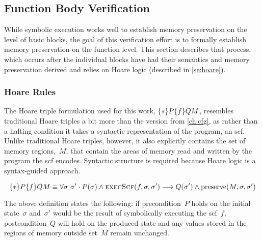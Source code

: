 \subsection{Function Body Verification}
While symbolic execution works well to establish memory preservation on the level of basic blocks,
the goal of this verification effort is to formally establish memory preservation
on the function level. This section describes that process,
which occurs after the individual blocks have had their semantics and memory preservation derived
and relies on Hoare logic (described in \cref{se:hoare}).

\subsubsection{Hoare Rules}\label{scf_hoare}
The Hoare triple formulation used for this work, $\{*\}P\{f\}{Q}M$,
resembles traditional Hoare triples a bit more than the version from \cref{ch:cfg},%
as rather than a halting condition
it takes a syntactic representation of the program, an \ac{scf}.
Unlike traditional Hoare triples, however,
it also explicitly contains the set of memory regions,~$M$,
that contain the areas of memory read and written by the program the \ac{scf} encodes.
Syntactic structure is required because Hoare logic is a syntax-guided approach.
\begin{definition}\label{def:preserve}
  \begin{equation}
    \{*\}P\{f\}{Q}{M}\equiv
    \forall\sigma~\sigma'\cdot P(\sigma)\wedge\operatorname{\textsc{execScf}}(f,\sigma,\sigma')\longrightarrow
    Q(\sigma')\wedge\operatorname{preserve}(M,\sigma,\sigma')
  \end{equation}
\end{definition}
The above definition states the following:
if precondition~$P$ holds on the initial state~$\sigma$
and~$\sigma'$ would be the result of symbolically executing the \ac{scf}~$f$,
postcondition~$Q$ will hold on the produced state
and any values stored in the regions of memory outside set~$M$ remain unchanged.

